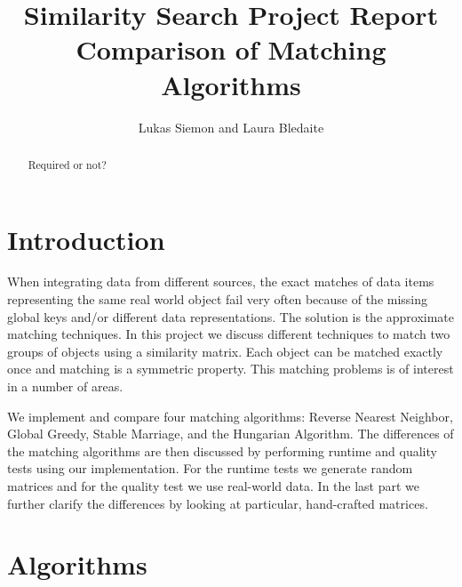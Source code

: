 \documentclass[a4paper,11pt]{article}
\newcommand\etc{\textsl{etc}}
\begin{document}
\title{
  \textbf{\large Similarity Search Project Report}\\
  Comparison of Matching Algorithms
}

\author{Lukas Siemon and Laura Bledaite}
\maketitle

\begin{abstract}
Required or not?
\end{abstract}

\section{Introduction}

When integrating data from different sources, the exact matches of data items representing the same real world object fail very often because of the missing global keys and/or different data representations. The solution is the approximate matching techniques. In this project we discuss different techniques to match two groups of objects using a similarity matrix. Each object can be matched exactly once and matching is a symmetric property. This matching problems is of interest in a number of areas.

We implement and compare four matching algorithms: Reverse Nearest Neighbor, Global Greedy, Stable Marriage, and the Hungarian Algorithm. 
The differences of the matching algorithms are then discussed by performing runtime and quality tests using our implementation. For the runtime tests we generate random matrices and for the quality test we use real-world data. In the last part we further clarify the differences by looking at particular, hand-crafted matrices.

 

\section{Algorithms}
\end{document}
